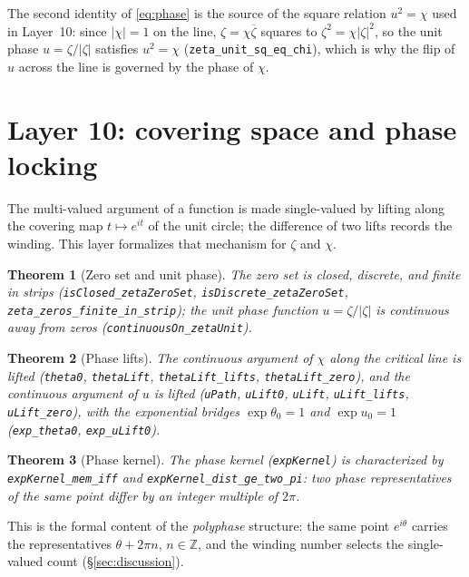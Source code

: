 \documentclass{article}
\newtheorem{theorem}{Theorem}[section]
\newcommand{\Z}{\mathbb{Z}}
\newcommand{\zt}{\zeta}
\newcommand{\Xchi}{\chi}
\begin{document}
The second identity of \eqref{eq:phase} is the source of the square
relation $u^2=\Xchi$ used in Layer~10: since $|\Xchi|=1$ on the line,
$\zt=\Xchi\overline{\zt}$ squares to $\zt^2=\Xchi|\zt|^2$, so the unit
phase $u=\zt/|\zt|$ satisfies $u^2=\Xchi$ (\texttt{zeta\_unit\_sq\_eq\_chi}),
which is why the flip of $u$
across the line is governed by the phase of $\Xchi$.

\section{Layer 10: covering space and phase locking}
\label{sec:L10}

The multi-valued argument of a function is made single-valued by lifting
along the covering map $t\mapsto e^{it}$ of the unit circle; the difference
of two lifts records the winding. This layer formalizes that mechanism for
$\zt$ and $\Xchi$.

\begin{theorem}[Zero set and unit phase]
\label{thm:zeroset}
The zero set is closed, discrete, and finite in strips
(\texttt{isClosed\_zetaZeroSet}, \texttt{isDiscrete\_zetaZeroSet},
\texttt{zeta\_zeros\_finite\_in\_strip}); the unit phase function
$u=\zt/|\zt|$ is continuous away from zeros
(\texttt{continuousOn\_zetaUnit}).
\end{theorem}

\begin{theorem}[Phase lifts]
\label{thm:lifts}
The continuous argument of $\Xchi$ along the critical line is lifted
(\texttt{theta0}, \texttt{thetaLift}, \texttt{thetaLift\_lifts},
\texttt{thetaLift\_zero}), and the continuous argument of $u$ is lifted
(\texttt{uPath}, \texttt{uLift0}, \texttt{uLift}, \texttt{uLift\_lifts},
\texttt{uLift\_zero}), with the exponential bridges
$\exp\theta_0=1$ and $\exp u_0=1$ (\texttt{exp\_theta0},
\texttt{exp\_uLift0}).
\end{theorem}

\begin{theorem}[Phase kernel]
\label{thm:kernel}
The phase kernel (\texttt{expKernel}) is characterized by
\texttt{expKernel\_mem\_iff} and \texttt{expKernel\_dist\_ge\_two\_pi}: two
phase representatives of the same point differ by an integer multiple of
$2\pi$.
\end{theorem}

This is the formal content of the \emph{polyphase} structure: the same
point $e^{i\theta}$ carries the representatives $\theta+2\pi n$,
$n\in\Z$, and the winding number selects the single-valued count
(\S\ref{sec:discussion}).
\end{document}
